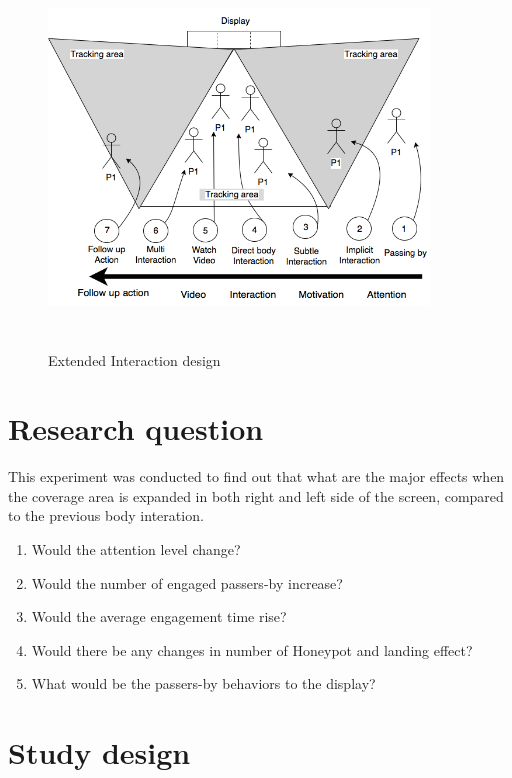 \begin{figure}[H]
    \centering
    \includegraphics[width=0.9\textwidth,height=10cm]{Figures/9/enhanced_interaction_design}
    \caption{Extended Interaction design}%
    \label{fig:KinectExtended}%
\end{figure}




\section{Research question}
This experiment was conducted to find out that what are the major effects when the coverage area is expanded in both right and left side of the screen, compared to the previous body interation.

\begin{enumerate}
\item Would the attention level change?
\item Would the number of engaged passers-by increase?
\item Would the average engagement time rise?
\item Would there be any changes in number of Honeypot and landing effect?
\item What would be the passers-by behaviors to the display?
\end{enumerate}



\section{Study design}


